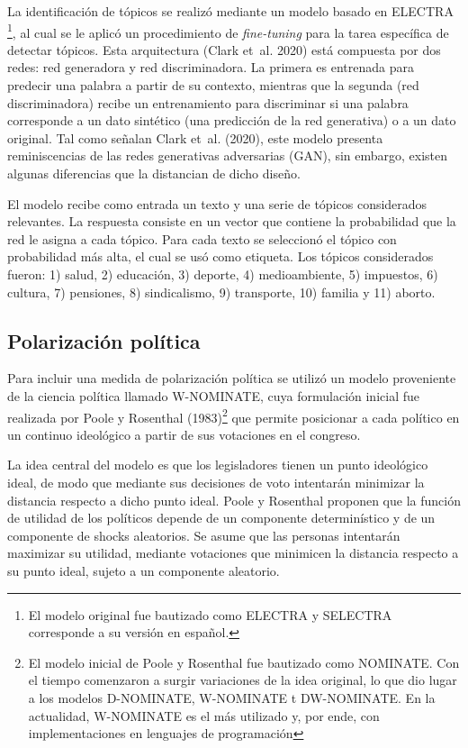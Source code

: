 \documentclass[
  12pt,
]{article}
\begin{document}
La identificación de tópicos se realizó mediante un modelo basado en
ELECTRA
\footnote{El modelo original fue bautizado como ELECTRA y SELECTRA corresponde a su versión en español.},
al cual se le aplicó un procedimiento de \emph{fine-tuning} para la
tarea específica de detectar tópicos. Esta arquitectura (Clark et~al.
2020) está compuesta por dos redes: red generadora y red discriminadora.
La primera es entrenada para predecir una palabra a partir de su
contexto, mientras que la segunda (red discriminadora) recibe un
entrenamiento para discriminar si una palabra corresponde a un dato
sintético (una predicción de la red generativa) o a un dato original.
Tal como señalan Clark et~al. (2020), este modelo presenta
reminiscencias de las redes generativas adversarias (GAN), sin embargo,
existen algunas diferencias que la distancian de dicho diseño.

El modelo recibe como entrada un texto y una serie de tópicos
considerados relevantes. La respuesta consiste en un vector que contiene
la probabilidad que la red le asigna a cada tópico. Para cada texto se
seleccionó el tópico con probabilidad más alta, el cual se usó como
etiqueta. Los tópicos considerados fueron: 1) salud, 2) educación, 3)
deporte, 4) medioambiente, 5) impuestos, 6) cultura, 7) pensiones, 8)
sindicalismo, 9) transporte, 10) familia y 11) aborto.

\hypertarget{polarizaciuxf3n-poluxedtica}{%
\subsection{\texorpdfstring{Polarización política
\label{apartado_nominate}}{Polarización política }}\label{polarizaciuxf3n-poluxedtica}}

Para incluir una medida de polarización política se utilizó un modelo
proveniente de la ciencia política llamado W-NOMINATE, cuya formulación
inicial fue realizada por Poole y Rosenthal
(1983)\footnote{El modelo inicial de Poole y Rosenthal fue bautizado como NOMINATE. Con el tiempo comenzaron a surgir variaciones de la idea original, lo que dio lugar a los modelos D-NOMINATE, W-NOMINATE t DW-NOMINATE. En la actualidad, W-NOMINATE es el más utilizado y, por ende, con implementaciones en lenguajes de programación}
que permite posicionar a cada político en un continuo ideológico a
partir de sus votaciones en el congreso.

La idea central del modelo es que los legisladores tienen un punto
ideológico ideal, de modo que mediante sus decisiones de voto intentarán
minimizar la distancia respecto a dicho punto ideal. Poole y Rosenthal
proponen que la función de utilidad de los políticos depende de un
componente determinístico y de un componente de shocks aleatorios. Se
asume que las personas intentarán maximizar su utilidad, mediante
votaciones que minimicen la distancia respecto a su punto ideal, sujeto
a un componente aleatorio.
\end{document}
